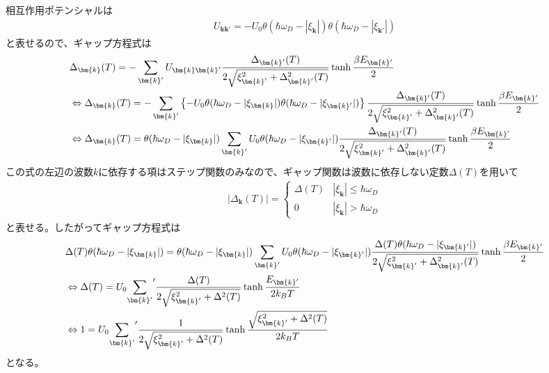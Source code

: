 \documentclass[dvipdfmx, 11pt, a4paper]{jsarticle}
\numberwithin{equation}{section}
\theoremstyle{definition}
\begin{document}
    \begin{derivationBox}
        相互作用ポテンシャルは
        \begin{align}
            U_{\bm{k}\bm{k}'} = -U_0 \theta(\hbar \omega_D - |\xi_{\bm{k}}|) \theta(\hbar \omega_D - |\xi_{\bm{k}'}|)
        \end{align}
        と表せるので、ギャップ方程式は
        \begin{align}
            &\Delta_{\bm{k}}(T) = -\sum_{\bm{k}'} U_{\bm{k}\bm{k}'}  \frac{\Delta_{\bm{k}'}(T)}{2\sqrt{\xi_{\bm{k}'}^2 + \Delta_{\bm{k}'}^2(T)}} \tanh \frac{\beta E_{\bm{k}'}}{2} \notag \\
            &\Leftrightarrow \Delta_{\bm{k}}(T) = -\sum_{\bm{k}'} \left\{  -U_0 \theta(\hbar \omega_D - |\xi_{\bm{k}}|) \theta(\hbar \omega_D - |\xi_{\bm{k}'}|) \right\}  \frac{\Delta_{\bm{k}'}(T)}{2\sqrt{\xi_{\bm{k}'}^2 + \Delta_{\bm{k}'}^2(T)}} \tanh \frac{\beta E_{\bm{k}'}}{2} \notag \\
            &\Leftrightarrow \Delta_{\bm{k}}(T) = \theta(\hbar \omega_D - |\xi_{\bm{k}}|)\sum_{\bm{k}'} U_0  \theta(\hbar \omega_D - |\xi_{\bm{k}'}|)  \frac{\Delta_{\bm{k}'}(T)}{2\sqrt{\xi_{\bm{k}'}^2 + \Delta_{\bm{k}'}^2(T)}} \tanh \frac{\beta E_{\bm{k}'}}{2} \notag \\
        \end{align}
        この式の左辺の波数$k$に依存する項はステップ関数のみなので、ギャップ関数は波数に依存しない定数$\Delta(T)$を用いて
        \begin{align}
            |\Delta_{\bm{k}}(T)| = 
            \left\{
            \begin{matrix}
                \Delta(T)&|\xi_{\bm{k}}| \le \hbar \omega_D\\
                0&|\xi_{\bm{k}}|>\hbar \omega_D
            \end{matrix}
            \right.
        \end{align}
        と表せる。したがってギャップ方程式は
        \begin{align}
            &\Delta(T) \theta (\hbar \omega_D - |\xi_{\bm{k}}|) = \theta(\hbar \omega_D - |\xi_{\bm{k}}|)\sum_{\bm{k}'} U_0  \theta(\hbar \omega_D - |\xi_{\bm{k}'}|)  \frac{\Delta (T) \theta(\hbar \omega_D - |\xi_{\bm{k}'}|)}{2\sqrt{\xi_{\bm{k}'}^2 + \Delta_{\bm{k}'}^2(T)}} \tanh \frac{\beta E_{\bm{k}'}}{2} \notag \\
            &\Leftrightarrow \Delta(T)  =  U_0{\sum_{\bm{k}'}}'   \frac{\Delta (T) }{2\sqrt{\xi_{\bm{k}'}^2 + \Delta^2(T)}} \tanh \frac{ E_{\bm{k}'}}{2k_B T} \notag \\
            &\Leftrightarrow 1  =  U_0{\sum_{\bm{k}'}}'   \frac{1}{2\sqrt{\xi_{\bm{k}'}^2 + \Delta^2(T)}} \tanh \frac{ \sqrt{\xi_{\bm{k}'}^2 + \Delta^2(T)}}{2k_B T} 
        \end{align}
        となる。
    \end{derivationBox}
\end{document}
